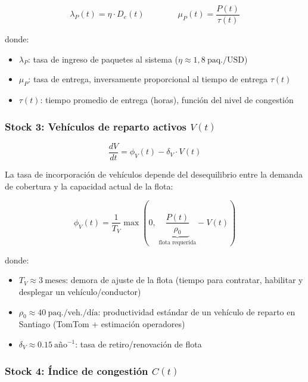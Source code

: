 \documentclass[12pt,a4paper]{article}
\begin{document}
\begin{equation}
\lambda_P(t) = \eta \cdot D_e(t) \qquad\qquad
\mu_P(t) = \frac{P(t)}{\tau(t)}
\end{equation}

donde:
\begin{itemize}[leftmargin=2cm,itemsep=2pt]
  \item $\lambda_P$: tasa de ingreso de paquetes al sistema ($\eta \approx 1{,}8\ \text{paq./USD}$)
  \item $\mu_P$: tasa de entrega, inversamente proporcional al tiempo de entrega $\tau(t)$
  \item $\tau(t)$: tiempo promedio de entrega (horas), función del nivel de congestión
\end{itemize}

\subsubsection{Stock 3: Vehículos de reparto activos $V(t)$}

\begin{equation}
\boxed{
\frac{dV}{dt} = \phi_V(t) - \delta_V \cdot V(t)
}
\label{eq:vehiculos}
\end{equation}

La tasa de incorporación de vehículos depende del desequilibrio entre
la demanda de cobertura y la capacidad actual de la flota:

\begin{equation}
\phi_V(t) = \frac{1}{T_V}\max\!\left(0,\;
  \underbrace{\frac{P(t)}{\rho_0}}_{\text{flota requerida}}
  - V(t)\right)
\end{equation}

donde:
\begin{itemize}[leftmargin=2cm,itemsep=2pt]
  \item $T_V \approx 3\ \text{meses}$: demora de ajuste de la flota
    (tiempo para contratar, habilitar y desplegar un vehículo/conductor)
  \item $\rho_0 \approx 40\ \text{paq./veh./día}$: productividad estándar
    de un vehículo de reparto en Santiago (TomTom + estimación operadores)
  \item $\delta_V \approx 0.15\ \text{año}^{-1}$: tasa de retiro/renovación de flota
\end{itemize}

\subsubsection{Stock 4: Índice de congestión $C(t)$}
\end{document}
